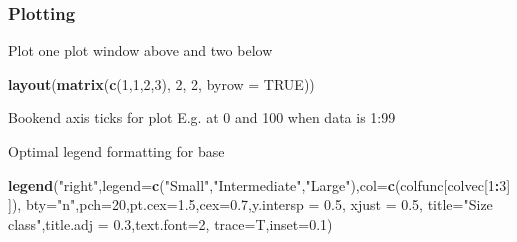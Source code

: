 \documentclass[10,portrait]{article}
\newenvironment{Shaded}{\begin{snugshade}}{\end{snugshade}}
\newcommand{\KeywordTok}[1]{\textcolor[rgb]{0.13,0.29,0.53}{\textbf{#1}}}
\newcommand{\DataTypeTok}[1]{\textcolor[rgb]{0.13,0.29,0.53}{#1}}
\newcommand{\DecValTok}[1]{\textcolor[rgb]{0.00,0.00,0.81}{#1}}
\newcommand{\FloatTok}[1]{\textcolor[rgb]{0.00,0.00,0.81}{#1}}
\newcommand{\StringTok}[1]{\textcolor[rgb]{0.31,0.60,0.02}{#1}}
\newcommand{\CommentTok}[1]{\textcolor[rgb]{0.56,0.35,0.01}{\textit{#1}}}
\newcommand{\OtherTok}[1]{\textcolor[rgb]{0.56,0.35,0.01}{#1}}
\newcommand{\OperatorTok}[1]{\textcolor[rgb]{0.81,0.36,0.00}{\textbf{#1}}}
\newcommand{\NormalTok}[1]{#1}
\begin{document}
\subsubsection{Plotting}\label{plotting}

Plot one plot window above and two below

\begin{Shaded}
\begin{Highlighting}[]
\KeywordTok{layout}\NormalTok{(}\KeywordTok{matrix}\NormalTok{(}\KeywordTok{c}\NormalTok{(}\DecValTok{1}\NormalTok{,}\DecValTok{1}\NormalTok{,}\DecValTok{2}\NormalTok{,}\DecValTok{3}\NormalTok{), }\DecValTok{2}\NormalTok{, }\DecValTok{2}\NormalTok{, }\DataTypeTok{byrow =} \OtherTok{TRUE}\NormalTok{))}
\end{Highlighting}
\end{Shaded}

Bookend axis ticks for plot E.g. at 0 and 100 when data is 1:99

\begin{Shaded}
\end{Shaded}

Optimal legend formatting for base

\begin{Shaded}
\begin{Highlighting}[]
\KeywordTok{legend}\NormalTok{(}\StringTok{"right"}\NormalTok{,}\DataTypeTok{legend=}\KeywordTok{c}\NormalTok{(}\StringTok{"Small"}\NormalTok{,}\StringTok{"Intermediate"}\NormalTok{,}\StringTok{"Large"}\NormalTok{),}\DataTypeTok{col=}\KeywordTok{c}\NormalTok{(colfunc[colvec[}\DecValTok{1}\OperatorTok{:}\DecValTok{3}\NormalTok{]]),}
       \DataTypeTok{bty=}\StringTok{"n"}\NormalTok{,}\DataTypeTok{pch=}\DecValTok{20}\NormalTok{,}\DataTypeTok{pt.cex=}\FloatTok{1.5}\NormalTok{,}\DataTypeTok{cex=}\FloatTok{0.7}\NormalTok{,}\DataTypeTok{y.intersp =} \FloatTok{0.5}\NormalTok{, }\DataTypeTok{xjust =} \FloatTok{0.5}\NormalTok{,}
       \DataTypeTok{title=}\StringTok{"Size class"}\NormalTok{,}\DataTypeTok{title.adj =} \FloatTok{0.3}\NormalTok{,}\DataTypeTok{text.font=}\DecValTok{2}\NormalTok{,}
       \DataTypeTok{trace=}\NormalTok{T,}\DataTypeTok{inset=}\FloatTok{0.1}\NormalTok{)}
\end{Highlighting}
\end{Shaded}
\end{document}
